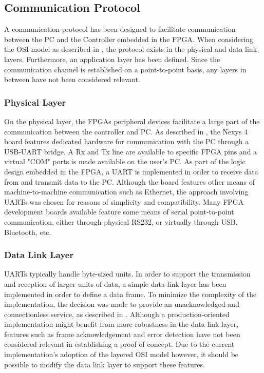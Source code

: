 \documentclass[main.tex]{subfiles}
\begin{document}


\subsection{Communication Protocol}
A communication protocol has been designed to facilitate communication between the PC and the Controller embedded in the FPGA. When considering the OSI model as described in \cite[p.28]{tanenbaumcomputer}, the protocol exists in the physical and data link layers. Furthermore, an application layer has been defined. Since the communication channel is established on a point-to-point basis, any layers in between have not been considered relevant. 

\subsubsection{Physical Layer}

On the physical layer, the FPGAs peripheral devices facilitate a large part of the communication between the controller and PC. As described in \cite[p.9]{nexys4reference}, the Nexys 4 board features dedicated hardware for communication with the PC through a USB-UART bridge. A Rx and Tx line are available to specific FPGA pins and a virtual "COM" ports is made available on the user's PC. As part of the logic design embedded in the FPGA, a UART is implemented in order to receive data from and transmit data to the PC. Although the board features other means of machine-to-machine communication such as Ethernet, the approach involving UARTs was chosen for reasons of simplicity and compatibility. Many FPGA development boards available feature some means of serial point-to-point communication, either through physical RS232, or virtually through USB, Bluetooth, etc.

\subsubsection{Data Link Layer}

UARTs typically handle byte-sized units. In order to support the transmission and reception of larger units of data, a simple data-link layer has been implemented in order to define a data frame. To minimize the complexity of the implementation, the decision was made to provide an unacknowledged and  connectionless service, as described in \cite[p.177]{tanenbaumcomputer}. Although a production-oriented implementation might benefit from more robustness in the data-link layer, features such as frame acknowledgement and error detection have not been considered relevant in establishing a proof of concept. Due to the current implementation's adoption of the layered OSI model however, it should be possible to modify the data link layer to support these features. 
\end{document}
